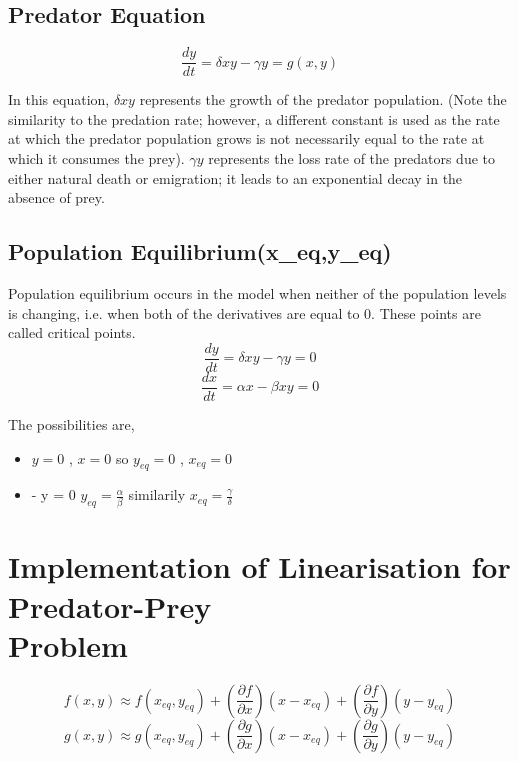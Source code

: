 \documentclass[12pt]{article}
\begin{document}
\subsection*{Predator Equation}
\begin{equation*}
    \frac { d y } { d t } = \delta x y - \gamma y = g(x,y)
\end{equation*}

In this equation, $ \delta x y $ represents the growth of the predator population. (Note the similarity to the predation rate;
however, a different constant is used as the rate at which the predator population grows is not necessarily equal to the
rate at which it consumes the prey). $ \gamma y $ represents the loss rate of the predators due to either natural death or
emigration; it leads to an exponential decay in the absence of prey.

\subsection*{Population Equilibrium(x_{eq},y_{eq})}
Population equilibrium occurs in the model when neither of the population levels is changing, i.e. when both of the
derivatives are equal to $ 0 . $ These points are called critical points.
\begin{equation*}
    \frac { d y } { d t } = \delta x y - \gamma y = 0
\end{equation*}
\begin{equation*}
     \frac { d x } { d t } = \alpha x - \beta x y = 0
\end{equation*}

The possibilities are, 
\begin{itemize}
    \item $ y = 0 $ , $ x = 0 $ so $ y_{eq} = 0 $ , $ x_{eq} = 0 $
    \item \alpha - \beta y = 0 \Longrightarrow $y_{eq} = \frac{\alpha}{\beta}$ similarily $x_{eq} = \frac{\gamma}{\delta}$
\end{itemize}

\section*{Implementation of Linearisation for Predator-Prey \\ Problem } \cite{noauthor_differential_nodate}

\begin{equation*}
    f ( x , y ) \approx f ( x_{eq} , y_{eq} ) + \left( \frac { \partial f } { \partial x } \right) ( x - x_{eq} ) + \left( \frac { \partial f } { \partial y } \right) ( y - y_{eq} )
\end{equation*}
\begin{equation*}
     g ( x , y ) \approx g ( x_{eq} , y_{eq} ) + \left( \frac { \partial g } { \partial x } \right) ( x - x_{eq} ) + \left( \frac { \partial g } { \partial y } \right) ( y - y_{eq} )
\end{equation*}
\end{document}
